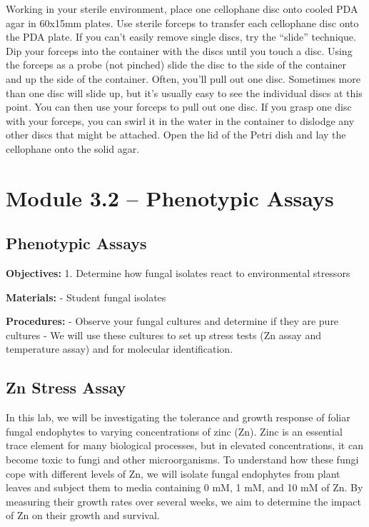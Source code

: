 \documentclass[
  letterpaper,
  DIV=11,
  numbers=noendperiod]{scrreprt}
\begin{document}
Working in your sterile environment, place one cellophane disc onto
cooled PDA agar in 60x15mm plates. Use sterile forceps to transfer each
cellophane disc onto the PDA plate. If you can't easily remove single
discs, try the ``slide'' technique. Dip your forceps into the container
with the discs until you touch a disc. Using the forceps as a probe (not
pinched) slide the disc to the side of the container and up the side of
the container. Often, you'll pull out one disc. Sometimes more than one
disc will slide up, but it's usually easy to see the individual discs at
this point. You can then use your forceps to pull out one disc. If you
grasp one disc with your forceps, you can swirl it in the water in the
container to dislodge any other discs that might be attached. Open the
lid of the Petri dish and lay the cellophane onto the solid agar.

\section*{Module 3.2 -- Phenotypic
Assays}\label{module-3.2-phenotypic-assays}


\subsection*{Phenotypic Assays}\label{phenotypic-assays}

\textbf{Objectives:} 1. Determine how fungal isolates react to
environmental stressors

\textbf{Materials:} - Student fungal isolates

\textbf{Procedures:} - Observe your fungal cultures and determine if
they are pure cultures - We will use these cultures to set up stress
tests (Zn assay and temperature assay) and for molecular identification.

\subsection*{Zn Stress Assay}\label{zn-stress-assay}

In this lab, we will be investigating the tolerance and growth response
of foliar fungal endophytes to varying concentrations of zinc (Zn). Zinc
is an essential trace element for many biological processes, but in
elevated concentrations, it can become toxic to fungi and other
microorganisms. To understand how these fungi cope with different levels
of Zn, we will isolate fungal endophytes from plant leaves and subject
them to media containing 0 mM, 1 mM, and 10 mM of Zn. By measuring their
growth rates over several weeks, we aim to determine the impact of Zn on
their growth and survival.
\end{document}
